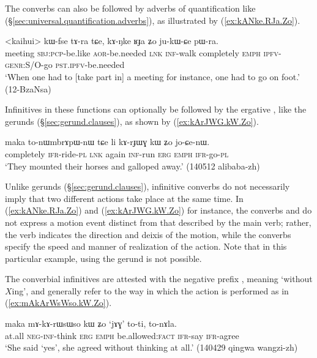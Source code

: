The converbs can also be followed by adverbs of quantification like  (§\ref{sec:universal.quantification.adverbs}), as illustrated by (\ref{ex:kANke.RJa.Zo}).

\begin{exe}
\ex \label{ex:kANke.RJa.Zo}
\gll <kaihui> kɯ-fse tɤ-ra tɕe, kɤ-ŋke ʁɟa ʑo ju-kɯ-ɕe pɯ-ra. \\
meeting \textsc{sbj}:\textsc{pcp}-be.like \textsc{aor}-be.needed \textsc{lnk} \textsc{inf}-walk completely \textsc{emph} \textsc{ipfv}-\textsc{genr}:S/O-go \textsc{pst}.\textsc{ipfv}-be.needed \\
\glt `When one had to [take part in] a meeting for instance, one had to go on foot.' (12-BzaNsa)
\end{exe}

Infinitives in these functions can optionally be followed by the ergative , like the gerunds (§\ref{sec:gerund.clauses}), as shown by (\ref{ex:kArJWG.kW.Zo}). 

\begin{exe}
\ex \label{ex:kArJWG.kW.Zo}
\gll maka to-nɯmbrɤpɯ-nɯ tɕe li kɤ-rɟɯɣ kɯ ʑo jo-ɕe-nɯ. \\
completely \textsc{ifr}-ride-\textsc{pl} \textsc{lnk} again \textsc{inf}-run \textsc{erg} \textsc{emph} \textsc{ifr}-go-\textsc{pl} \\
\glt `They mounted their horses and galloped away.' (140512 alibaba-zh)
\end{exe}

Unlike gerunds (§\ref{sec:gerund.clauses}), infinitive converbs do not necessarily imply that two different actions take place at the same time. In (\ref{ex:kANke.RJa.Zo}) and (\ref{ex:kArJWG.kW.Zo}) for instance, the converbs  and  do not express a motion event distinct from that described by the main verb; rather, the verb  indicates the direction and deixis of the motion, while the converbs specify the speed and manner of realization of the action. Note that in this particular example, using the gerund is not possible.

The converbial infinitives are attested with the negative prefix , meaning `without $X$ing', and generally refer to the way in which the action is performed as in (\ref{ex:mAkArWsWso.kW.Zo}). 

\begin{exe}
\ex \label{ex:mAkArWsWso.kW.Zo}
\gll   maka mɤ-kɤ-rɯsɯso kɯ ʑo `jɤɣ' to-ti, to-nɤla. \\
at.all \textsc{neg}-\textsc{inf}-think \textsc{erg} \textsc{emph} be.allowed:\textsc{fact} \textsc{ifr}-say \textsc{ifr}-agree \\
\glt `She said `yes', she agreed without thinking at all.' (140429 qingwa wangzi-zh)
\end{exe}

